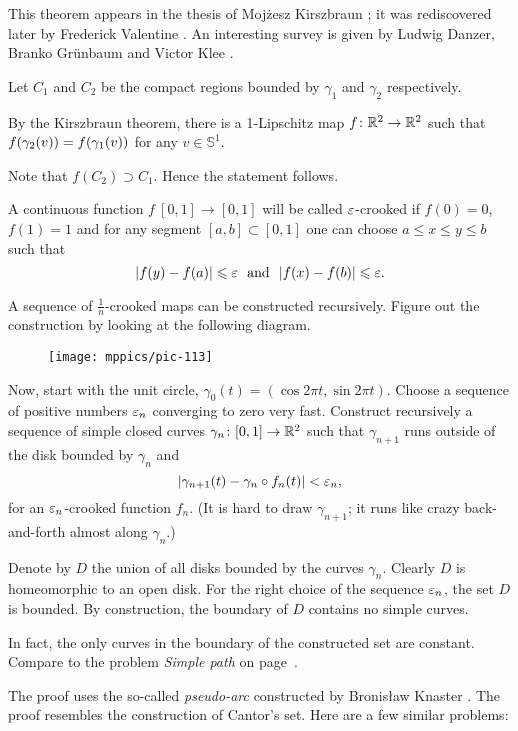 This theorem  appears in the thesis of Mojżesz Kirszbraun \cite[][]{kirszbraun};
it was rediscovered later by Frederick Valentine \cite[][]{valentine}.
An interesting survey is given by 
Ludwig Danzer, Branko Grünbaum and Victor Klee \cite[][]{danzer-grunbaum-klee}.

\medskip

Let $C_1$ and $C_2$ be the compact regions bounded by $\gamma_1$ and $\gamma_2$ respectively.

By the Kirszbraun theorem, there is a 1-Lipschitz map $f\colon\mathbb{R}^2\to\mathbb{R}^2$ 
such that $f(\gamma_2(v))\z=f(\gamma_1(v))$ for any $v\in\mathbb S^1$.

Note that $f(C_2)\supset C_1$.
Hence the statement follows.\qeds

A continuous function $f\:[0,1]\to [0,1]$
will be called $\varepsilon$-crooked 
if $f(0)=0$, $f(1)=1$ 
and for any segment $[a,b]\subset [0,1]$ 
one can choose $a\le x\le y\le b$ 
such that
\[|f(y)-f(a)|\le\eps\ \ \text{and}\ \ |f(x)-f(b)|\le\eps.\]

A sequence of $\tfrac1n$-crooked maps can be constructed recursively. 
Figure out the construction by looking at the following diagram.

\begin{figure}[ht!]
\centering
\texttt{[image: mppics/pic-113]}
\end{figure}

Now, start with the unit circle, 
$\gamma_0(t)=(\cos 2\pi t,\sin 2 \pi t)$.
Choose a sequence of positive numbers $\varepsilon_n$ converging to zero very fast. 
Construct recursively a sequence of simple closed curves $\gamma_n\:[0,1]\z\to\RR^2$ such that $\gamma_{n+1}$ runs outside of the disk bounded by $\gamma_n$
and 
\[|\gamma_{n+1}(t)-\gamma_n\circ f_n(t)|<\varepsilon_n,\]
for an $\varepsilon_n$-crooked function $f_n$.
(It is hard to draw $\gamma_{n+1}$; it runs like crazy back-and-forth almost along $\gamma_n$.)

Denote by $D$ the union of all disks bounded by the curves $\gamma_n$.
Clearly $D$ is homeomorphic to an open disk.
For the right choice of the sequence $\varepsilon_n$, 
the set $D$ is bounded.
By construction, the boundary of $D$ contains no simple curves. \qeds

In fact, the only curves in the boundary of the constructed set are constant. Compare to the problem \emph{Simple path} on page~\pageref{Simple path}.

The proof uses the so-called \emph{pseudo-arc} 
constructed by Bronis\l{}aw Knaster \cite{knaster}.
The proof resembles the construction of Cantor's set.
Here are a few similar problems:


